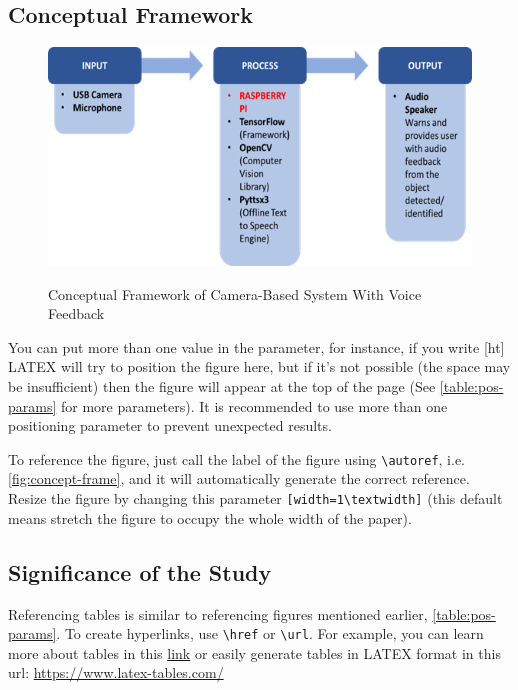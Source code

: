 \subsection{Conceptual Framework}

    \begin{figure}[ht]
        \caption{Conceptual Framework of Camera-Based System With Voice Feedback}
        \includegraphics[width=1\textwidth]{Images/conceptual-framework.png}
        \label{fig:concept-frame}
    \end{figure}

You can put more than one value in the parameter, for instance, if you write [ht] LATEX will try to position the figure here, but if it's not possible (the space may be insufficient) then the figure will appear at the top of the page (See \autoref{table:pos-params} for more parameters). It is recommended to use more than one positioning parameter to prevent unexpected results.

To reference the figure, just call the label of the figure using \verb|\autoref|, i.e. \autoref{fig:concept-frame}, and it will automatically generate the correct reference. Resize the figure by changing this parameter \verb|[width=1\textwidth]| (this default means stretch the figure to occupy the whole width of the paper).


\subsection{Significance of the Study}

    

Referencing tables is similar to referencing figures mentioned earlier, \autoref{table:pos-params}. To create hyperlinks, use \verb|\href| or \verb|\url|. For example, you can learn more about tables in this \href{https://www.overleaf.com/learn/latex/Tables}{link} or easily generate tables in LATEX format in this url: \url{https://www.latex-tables.com/}


